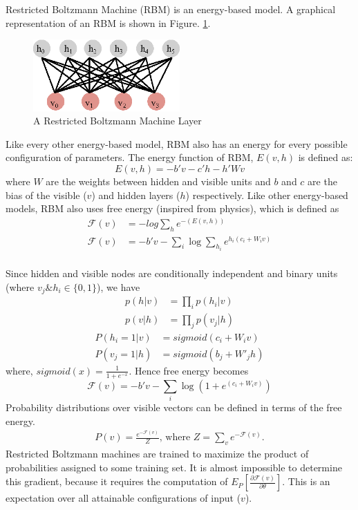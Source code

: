 Restricted Boltzmann Machine (RBM) is an energy-based model. A graphical representation of an RBM is shown in Figure. \ref{fig:rbm_layer}.

\begin{figure}[!ht]
  \centering
  \includegraphics[width=0.5\textwidth]{./imgs/rbm.eps}
  \caption{A Restricted Boltzmann Machine Layer}
  \label{fig:rbm_layer}
\end{figure}%

Like every other energy-based model, RBM also has an energy for every possible configuration of parameters. The energy function of RBM, $E(v,h)$ is defined as: 
$$E(v,h) = - b'v - c'h - h'Wv$$
where $W$ are the weights between hidden and visible units and $b$ and $c$ are the bias of the visible ($v$) and hidden layers ($h$) respectively. Like other energy-based models, RBM also uses free energy (inspired from physics), which is defined as
\begin{align*}
\mathcal{F}(v) &= -log \sum_{h}{e^{-(E(v,h))}} \\
\mathcal{F}(v) &= - b'v - \sum_i \log \sum_{h_i} e^{h_i (c_i + W_i v)}\\
\end{align*}

Since hidden and visible nodes are conditionally independent and binary units (where $v_j \& h_i \in \{0,1\}$), we have 
\begin{align}
p(h|v) &= \prod_i p(h_i|v) \\
p(v|h) &= \prod_j p(v_j|h) 
\end{align}
\begin{align}
P(h_i=1|v) &= sigmoid(c_i + W_i v) \label{eq:rbm_layers_prob1} \\
P(v_j=1|h) &= sigmoid(b_j + W'_j h) \label{eq:rbm_layers_prob2}
\end{align}
where, $sigmoid(x)= \frac{1}{1 + e^{-x}}$. Hence free energy becomes
$$\mathcal{F}(v)= - b'v - \sum_i \log(1 + e^{(c_i + W_i v)})$$ %
Probability distributions over visible vectors can be defined in terms of the free energy.
\begin{align*}
P(v) = \frac{e^{-\mathcal{F}(v)}}{Z} \text{, where } Z=\sum_v e^{-\mathcal{F}(v)}.
\end{align*}
Restricted Boltzmann machines are trained to maximize the product of probabilities assigned to some training set. It is almost impossible to determine this gradient, because it requires the computation of $E_P[\frac{\partial \mathcal{F}(v)} {\partial \theta} ]$. This is an expectation over all attainable configurations of input ($v$). \cite{hinton2010practical}

